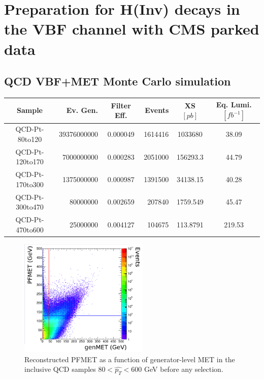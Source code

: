 \chapter{Preparation for H(Inv) decays in the VBF channel with CMS parked data}
\label{CHAPTER:PreparationParkedDataAnalysis}

\section{QCD VBF+MET Monte Carlo simulation}

\begin{table}
\centering
\begin{tabular}{|c|r|c|r|c|c|}
  \hline
  Sample          &       Ev. Gen. & Filter Eff. &  Events &  XS $[pb]$ & Eq. Lumi. $[fb^{-1}]$ \\
  \hline \hline
  QCD-Pt-80to120  & 39376000000 &    0.000049 & 1614416 &  1033680 &  38.09 \\
  QCD-Pt-120to170 &  7000000000 &    0.000283 & 2051000 & 156293.3 &  44.79 \\
  QCD-Pt-170to300 &  1375000000 &    0.000987 & 1391500 & 34138.15 &  40.28 \\
  QCD-Pt-300to470 &    80000000 &    0.002659 &  207840 & 1759.549 &  45.47 \\
  QCD-Pt-470to600 &    25000000 &    0.004127 &  104675 & 113.8791 & 219.53 \\
  \hline
\end{tabular}
\end{table}

\begin{figure}[h!]
\centering
\includegraphics[width=0.55\textwidth]{Chapter05/ParkedDataPreparation/Images/Joao_140209_p11.png}
\caption{Reconstructed PFMET as a function of generator-level MET
      in the inclusive QCD samples $80 < \hat{p_T} < 600$ GeV before
      any selection.}
\label{fig:qcdRecovsGenMET}
\end{figure}

